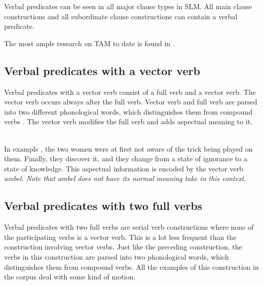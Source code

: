 
Verbal predicates can be seen in all major clause types in SLM. All main clause constructions and all subordinate clause constructions can contain a verbal predicate.

The most ample research on TAM  to date is found in \citep{Slomanson2007cll}.


\subsection{Verbal predicates with a vector verb}\label{sec:pred:Verbalpredicateswithavectorverb}
Verbal predicates with a vector verb consist of a full verb and a vector verb.  The vector verb occurs always after the full verb. Vector verb and full verb are parsed into two different phonological words, which distinguishes them from compound verbs . The vector verb modifies the full verb and adds aspectual meaning to it.


 \\
In example , the two women were at first not aware of the trick being played on them. Finally, they discover it, and they change from a state of ignorance to a state of knowledge. This aspectual information is encoded by the vector verb \em ambel\em. Note that \em ambel \em does not have its normal meaning \em take \em in this context.

\subsection{Verbal predicates with two full verbs}\label{sec:pred:Verbalpredicateswithtwofullverbs}
Verbal predicates with two full verbs are serial verb constructions where none of the participating verbs is a vector verb. This is a lot less frequent than the construction involving vector verbs. Just like the preceding construction, the verbs in this construction are parsed into two phonological words, which distinguishes them from compound verbs. All the examples of this construction in the corpus deal with some kind of motion.

